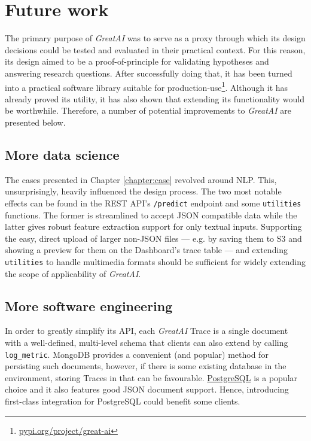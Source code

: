 \section{Future work} 

The primary purpose of \textit{GreatAI} was to serve as a proxy through which its design decisions could be tested and evaluated in their practical context. For this reason, its design aimed to be a proof-of-principle for validating hypotheses and answering research questions. After successfully doing that, it has been turned into a practical software library suitable for production-use\footnote{\href{https://pypi.org/project/great-ai/}{pypi.org/project/great-ai}}. Although it has already proved its utility, it has also shown that extending its functionality would be worthwhile. Therefore, a number of potential improvements to \textit{GreatAI} are presented below.
 
\subsection{More data science}

The cases presented in Chapter \ref{chapter:case} revolved around NLP. This, unsurprisingly, heavily influenced the design process. The two most notable effects can be found in the REST API's \texttt{/predict} endpoint and some \texttt{utilities} functions. The former is streamlined to accept JSON compatible data while the latter gives robust feature extraction support for only textual inputs. Supporting the easy, direct upload of larger non-JSON files --- e.g. by saving them to S3 and showing a preview for them on the Dashboard's trace table --- and extending \texttt{utilities} to handle multimedia formats should be sufficient for widely extending the scope of applicability of \textit{GreatAI}.

\subsection{More software engineering}

In order to greatly simplify its API, each \textit{GreatAI} Trace is a single document with a well-defined, multi-level schema that clients can also extend by calling \texttt{log\_metric}. MongoDB provides a convenient (and popular) method for persisting such documents, however, if there is some existing database in the environment, storing Traces in that can be favourable. \href{https://www.postgresql.org/}{PostgreSQL} is a popular choice and it also features good JSON document support. Hence, introducing first-class integration for PostgreSQL could benefit some clients.


